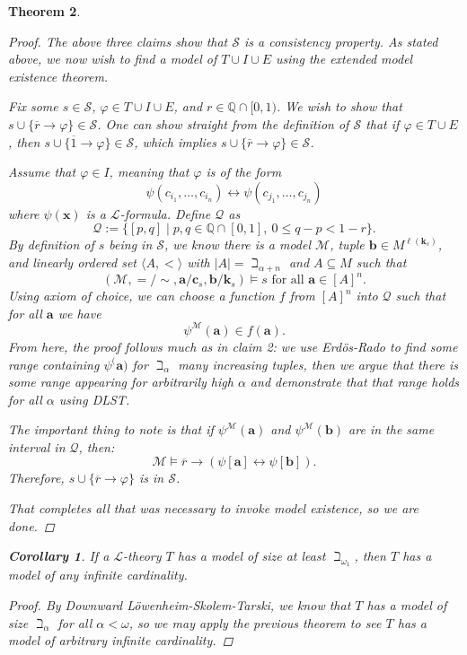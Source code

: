 \documentclass{amsart}
\newtheorem{theorem}{Theorem}[section]
\newtheorem{corollary}[theorem]{Corollary}
\theoremstyle{definition}
\numberwithin{equation}{theorem}
\renewcommand{\phi}{\varphi}
\newcommand{\Q}{\mathbb{Q}}
\newcommand{\V}{\mathbf}
\newcommand{\where}{\mid}
\newcommand{\rat}[1]{{\overline{#1}}}
\newcommand{\narrow}[1]{\xrightarrow{#1}}
\renewcommand{\to}{\narrow{}}
\newcommand{\len}{\ell}
\newcommand{\frag}{\mathcal{L}}
\begin{document}
\begin{theorem}
\begin{proof}
    The above three claims show that $\mathscr{S}$ is a consistency property.
    As stated above, we now wish to find a model of $T\cup I\cup E$ using the extended model existence theorem.
    
    Fix some $s\in \mathscr{S}$, $\phi\in T\cup I\cup E$, and $r\in\Q\cap[0,1)$.
    We wish to show that $s\cup\{\rat r\to\phi\}\in \mathscr{S}$.
    One can show straight from the definition of $\mathscr{S}$ that if $\phi\in T\cup E$, then $s\cup\{\rat 1\to\phi\}\in \mathscr{S}$, which implies $s\cup\{\rat r\to\phi\}\in \mathscr{S}$.
    
    Assume that $\phi\in I$, meaning that $\phi$ is of the form
    \[
      \psi(c_{i_1},\dots,c_{i_n})\leftrightarrow \psi(c_{j_1},\dots,c_{j_n})
    \]
    where $\psi(\V x)$ is a $\frag$-formula.
    Define $\mathcal Q$ as
    \[
      \mathcal Q:=\{[p,q]\where p,q\in\Q\cap[0,1],\ 0\leq q-p<1-r\}.
    \]
    By definition of $s$ being in $\mathscr{S}$, we know there is a model $\mathcal M$, tuple $\V b\in M^{\len(\V k_s)}$, and linearly ordered set $\langle A,<\rangle$ with $|A|=\beth_{\alpha+n}$ and $A\subseteq M$ such that
    \[
		  (\mathcal M,{=}/{\sim},\V a/\V c_s, \V b/\V k_s)\models s\text{ for all $\V a\in[A]^n$}.
		\]
    Using axiom of choice, we can choose a function $f$ from $[A]^n$ into $\mathcal Q$ such that for all $\V a$ we have
    \[
      \psi^\mathcal M(\V a)\in f(\V a).
    \]
    From here, the proof follows much as in claim 2: we use Erd\"os-Rado to find some range containing $\psi^\mathcal(\V a)$ for $\beth_\alpha$ many increasing tuples, then we argue that there is some range appearing for arbitrarily high $\alpha$ and demonstrate that that range holds for all $\alpha$ using DLST.
    
    The important thing to note is that if $\psi^\mathcal M(\V a)$ and $\psi^\mathcal M(\V b)$ are in the same interval in $\mathcal Q$, then:
    \[
      \mathcal M\models \rat r\to(\psi[\V a]\leftrightarrow\psi[\V b]).
    \]
    Therefore, $s\cup\{\rat r\to\phi\}$ is in $\mathscr{S}$. 
    
    That completes all that was necessary to invoke model existence, so we are done.
  \end{proof}
  \begin{corollary}\label{cor:lst}
    If a $\frag$-theory $T$ has a model of size at least $\beth_{\omega_1}$, then $T$ has a model of any infinite cardinality.
    \begin{proof}
      By Downward L\"owenheim-Skolem-Tarski, we know that $T$ has a model of size $\beth_\alpha$ for all $\alpha<\omega$, so we may apply the previous theorem to see $T$ has a model of arbitrary infinite cardinality.
    \end{proof}
  \end{corollary}
\end{theorem}
\end{document}
